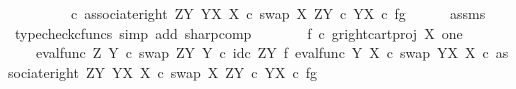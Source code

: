 \begin{isabellebody}
\ \ \ \ \ \ \ \ \ {\isasymcirc}\isactrlsub c\ associate{\isacharunderscore}{\kern0pt}right\ {\isacharparenleft}{\kern0pt}Z\isactrlbsup Y\isactrlesup {\isacharparenright}{\kern0pt}\ {\isacharparenleft}{\kern0pt}Y\isactrlbsup X\isactrlesup {\isacharparenright}{\kern0pt}\ X\ {\isasymcirc}\isactrlsub c\ swap\ X\ {\isacharparenleft}{\kern0pt}Z\isactrlbsup Y\isactrlesup \ {\isasymtimes}\isactrlsub c\ Y\isactrlbsup X\isactrlesup {\isacharparenright}{\kern0pt}{\isacharparenright}{\kern0pt}\isactrlsup {\isasymsharp}\ {\isasymcirc}\isactrlsub c\ {\isasymlangle}f{\isacharcomma}{\kern0pt}g{\isasymrangle}{\isachardoublequoteclose}\isanewline
\ \ \ \ \isamarkupfalse%
\ assms\ \isamarkupfalse%
\ {\isacharparenleft}{\kern0pt}typecheck{\isacharunderscore}{\kern0pt}cfuncs{\isacharcomma}{\kern0pt}\ simp\ add{\isacharcolon}{\kern0pt}\ sharp{\isacharunderscore}{\kern0pt}comp{\isacharparenright}{\kern0pt}\ \ \isanewline
\ \ \isamarkupfalse%
\ \isamarkupfalse%
\ {\isachardoublequoteopen}{\isacharparenleft}{\kern0pt}f\isactrlsup {\isasymflat}\ {\isasymcirc}\isactrlsub c\ {\isasymlangle}g\isactrlsup {\isasymflat}{\isacharcomma}{\kern0pt}right{\isacharunderscore}{\kern0pt}cart{\isacharunderscore}{\kern0pt}proj\ X\ one{\isasymrangle}{\isacharparenright}{\kern0pt}\isactrlsup {\isasymsharp}\ {\isacharequal}{\kern0pt}\isanewline
\ \ \ \ {\isacharparenleft}{\kern0pt}eval{\isacharunderscore}{\kern0pt}func\ Z\ Y\ {\isasymcirc}\isactrlsub c\ swap\ {\isacharparenleft}{\kern0pt}Z\isactrlbsup Y\isactrlesup {\isacharparenright}{\kern0pt}\ Y\ {\isasymcirc}\isactrlsub c\ {\isacharparenleft}{\kern0pt}id\isactrlsub c\ {\isacharparenleft}{\kern0pt}Z\isactrlbsup Y\isactrlesup {\isacharparenright}{\kern0pt}\ {\isasymtimes}\isactrlsub f\ eval{\isacharunderscore}{\kern0pt}func\ Y\ X\ {\isasymcirc}\isactrlsub c\ swap\ {\isacharparenleft}{\kern0pt}Y\isactrlbsup X\isactrlesup {\isacharparenright}{\kern0pt}\ X{\isacharparenright}{\kern0pt}\ {\isasymcirc}\isactrlsub c\ associate{\isacharunderscore}{\kern0pt}right\ {\isacharparenleft}{\kern0pt}Z\isactrlbsup Y\isactrlesup {\isacharparenright}{\kern0pt}\ {\isacharparenleft}{\kern0pt}Y\isactrlbsup X\isactrlesup {\isacharparenright}{\kern0pt}\ X\ {\isasymcirc}\isactrlsub c\ swap\ X\ {\isacharparenleft}{\kern0pt}Z\isactrlbsup Y\isactrlesup \ {\isasymtimes}\isactrlsub c\ Y\isactrlbsup X\isactrlesup {\isacharparenright}{\kern0pt}{\isacharparenright}{\kern0pt}\isactrlsup {\isasymsharp}\ {\isasymcirc}\isactrlsub c\ {\isasymlangle}f{\isacharcomma}{\kern0pt}g{\isasymrangle}{\isachardoublequoteclose}\isanewline

\end{isabellebody}
